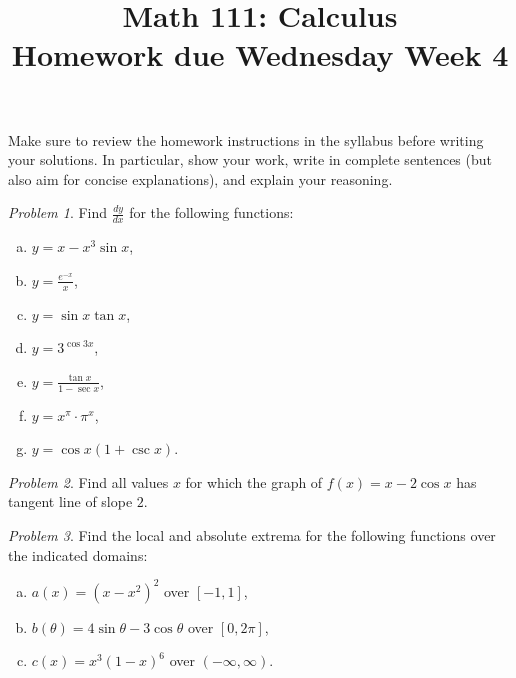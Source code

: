 \documentclass[11pt,twoside]{amsart}
\title{Math 111: Calculus\\ Homework due Wednesday Week 4}
\theoremstyle{plain}
\theoremstyle{remark}
\newtheorem{prob}{Problem}
\theoremstyle{definition}
\theoremstyle{definition}
\begin{document}
\maketitle

\noindent Make sure to review the homework instructions in the syllabus before writing your solutions. In particular, show your work, write in complete sentences (but also aim for concise explanations), and explain your reasoning.

\begin{prob}
Find $\frac{dy}{dx}$ for the following functions:
\begin{enumerate}[(a)]
\item $y = x-x^3\sin x$,
\item $y = \frac{e^{-x}}{x}$,
\item $y = \sin x\tan x$,
\item $y = 3^{\cos 3x}$,
\item $y = \displaystyle{\frac{\tan x}{1-\sec x}}$,
\item $y = x^\pi\cdot \pi^x$,
\item $y = \cos x(1+\csc x)$.
\end{enumerate}
\end{prob}

\begin{prob}
Find all values $x$ for which the graph of $f(x) = x-2\cos x$ has tangent line of slope $2$.
\end{prob}

\begin{prob}
Find the local and absolute extrema for the following functions over the indicated domains:
\begin{enumerate}[(a)]
\item $a(x) = (x-x^2)^2$ over $[-1,1]$,
\item $b(\theta) = 4\sin \theta - 3\cos \theta$ over $[0,2\pi]$,
\item $c(x) = x^3(1-x)^6$ over $(-\infty,\infty)$.
\end{enumerate}
\end{prob}
\end{document}
